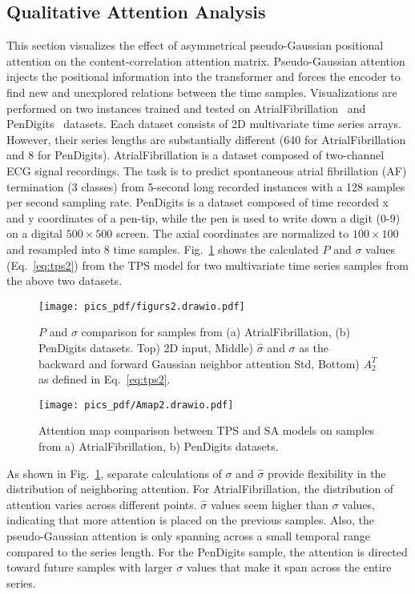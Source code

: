 \documentclass[journal]{IEEEtran}
\begin{document}
\subsection{Qualitative Attention Analysis}
This section visualizes the effect of asymmetrical pseudo-Gaussian positional attention on the content-correlation attention matrix. Pseudo-Gaussian attention injects the positional information into the transformer and forces the encoder to find new and unexplored relations between the time samples. Visualizations are performed on two instances trained and tested on AtrialFibrillation~\cite{bagnall2018uea} and PenDigits~\cite{bagnall2018uea} datasets. Each dataset consists of 2D multivariate time series arrays. However, their series lengths are substantially different (640 for AtrialFibrillation and 8 for PenDigits). AtrialFibrillation is a dataset composed of two-channel ECG signal recordings. The task is to predict spontaneous atrial fibrillation (AF) termination (3 classes) from 5-second long recorded instances with a 128 samples per second sampling rate. PenDigits is a dataset composed of time recorded x and y coordinates of a pen-tip, while the pen is used to write down a digit (0-9) on a digital $500\times 500$ screen. The axial coordinates are normalized to $100\times 100$ and resampled into 8 time samples. Fig.~\ref{fig:pmap} shows the calculated $P$ and $\sigma$ values (Eq.~\eqref{eq:tps2}) from the TPS model for two multivariate time series samples from the above two datasets.
\begin{figure}[!t]
\centering
\texttt{[image: pics\_pdf/figurs2.drawio.pdf]}
\caption{$P$ and $\sigma$ comparison for samples from (a) AtrialFibrillation, (b) PenDigits datasets. Top) 2D input, Middle) $\hat{\sigma}$ and $\sigma$ as the backward and forward Gaussian neighbor attention Std, Bottom) $A_2^T$ as defined in Eq.~\eqref{eq:tps2}.}
\label{fig:pmap}
\end{figure}

\begin{figure}[!t]
\centering
\texttt{[image: pics\_pdf/Amap2.drawio.pdf]}
\caption{Attention map comparison between TPS and SA models on samples from a) AtrialFibrillation, b) PenDigits datasets.}
\label{fig:amap}
\end{figure}
As shown in Fig.~\ref{fig:pmap}, separate calculations of $\sigma$ and $\hat{\sigma}$ provide flexibility in the distribution of neighboring attention. For AtrialFibrillation, the distribution of attention varies across different points. $\hat{\sigma}$ values seem higher than $\sigma$ values, indicating that more attention is placed on the previous samples. Also, the pseudo-Gaussian attention is only spanning across a small temporal range compared to the series length. For the PenDigits sample, the attention is directed toward future samples with larger $\sigma$ values that make it span across the entire series.
\end{document}
